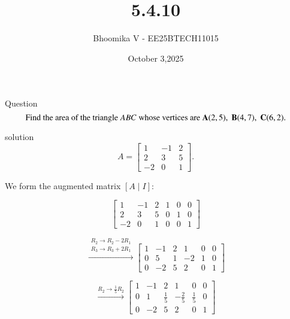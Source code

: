\documentclass{beamer}
\begin{document}
\title 
{5.4.10}
\date{October 3,2025}


\author 
{Bhoomika V - EE25BTECH11015}




\frame{\titlepage}
\begin{frame}{Question}
\[
\text{Find the area of the triangle } ABC \text{ whose vertices are }\\ \\
\vec{A}(2,5),\; \vec{B}(4,7),\; \vec{C}(6,2).
\]
\end{frame}

\begin{frame}{solution} 
\[
A = \begin{bmatrix}
1 & -1 & 2 \\
2 & 3 & 5 \\
-2 & 0 & 1
\end{bmatrix}.
\]

We form the augmented matrix $[A \mid I]$:

\[
\left[\begin{array}{ccc|ccc}
1 & -1 & 2 & 1 & 0 & 0\\
2 & 3 & 5 & 0 & 1 & 0\\
-2 & 0 & 1 & 0 & 0 & 1
\end{array}\right]
\]
\end{frame}

\begin{frame}
\[
\overset{\substack{R_2 \to R_2 - 2R_1 \\ R_3 \to R_3 + 2R_1}}{\longrightarrow}
\left[\begin{array}{ccc|ccc}
1 & -1 & 2 & 1 & 0 & 0\\
0 & 5 & 1 & -2 & 1 & 0\\
0 & -2 & 5 & 2 & 0 & 1
\end{array}\right]
\]

\[
\overset{R_2 \to \tfrac{1}{5}R_2}{\longrightarrow}
\left[\begin{array}{ccc|ccc}
1 & -1 & 2 & 1 & 0 & 0\\
0 & 1 & \tfrac{1}{5} & -\tfrac{2}{5} & \tfrac{1}{5} & 0\\
0 & -2 & 5 & 2 & 0 & 1
\end{array}\right]
\]
\end{frame}
\end{document}
